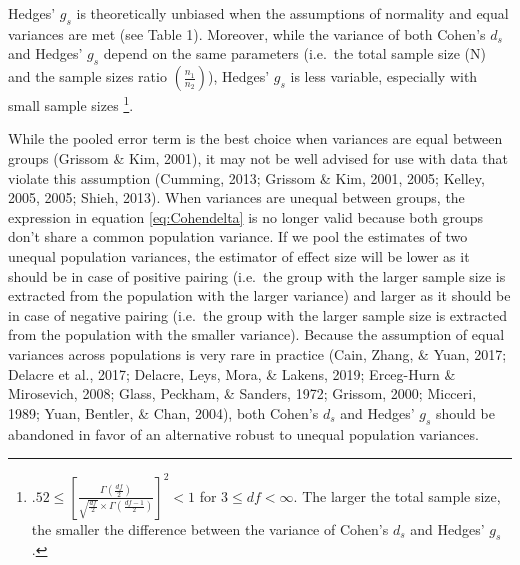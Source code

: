 \documentclass[
  man,floatsintext]{apa6}
\begin{document}
Hedges' \(g_s\) is theoretically unbiased when the assumptions of normality and equal variances are met (see Table 1). Moreover, while the variance of both Cohen's \(d_s\) and Hedges' \(g_s\) depend on the same parameters (i.e.~the total sample size (N) and the sample sizes ratio \(\left(\frac{n_1}{n_2}\right)\)), Hedges' \(g_s\) is less variable, especially with small sample sizes \footnote{$.52 \le \left[\frac{\Gamma(\frac{df}{2})}{\sqrt{\frac{df}{2}} \times \Gamma(\frac{df-1}{2})} \right] ^2 < 1$ for $3 \le df < \infty$. The larger the total sample size, the smaller the difference between the variance of Cohen's $d_s$ and Hedges' $g_s$.}.

While the pooled error term is the best choice when variances are equal between groups (Grissom \& Kim, 2001), it may not be well advised for use with data that violate this assumption (Cumming, 2013; Grissom \& Kim, 2001, 2005; Kelley, 2005, 2005; Shieh, 2013). When variances are unequal between groups, the expression in equation \ref{eq:Cohendelta} is no longer valid because both groups don't share a common population variance. If we pool the estimates of two unequal population variances, the estimator of effect size will be lower as it should be in case of positive pairing (i.e.~the group with the larger sample size is extracted from the population with the larger variance) and larger as it should be in case of negative pairing (i.e.~the group with the larger sample size is extracted from the population with the smaller variance). Because the assumption of equal variances across populations is very rare in practice (Cain, Zhang, \& Yuan, 2017; Delacre et al., 2017; Delacre, Leys, Mora, \& Lakens, 2019; Erceg-Hurn \& Mirosevich, 2008; Glass, Peckham, \& Sanders, 1972; Grissom, 2000; Micceri, 1989; Yuan, Bentler, \& Chan, 2004), both Cohen's \(d_s\) and Hedges' \(g_s\) should be abandoned in favor of an alternative robust to unequal population variances.
\end{document}

